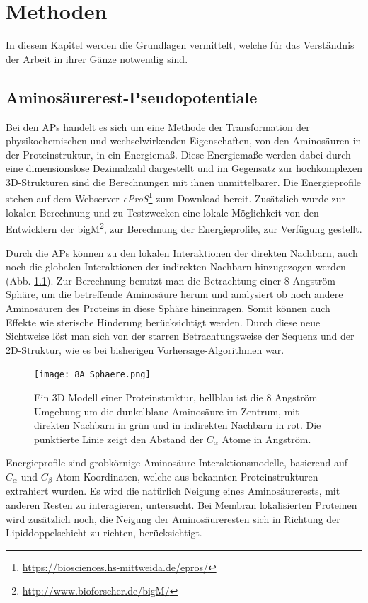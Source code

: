 \chapter{Methoden}

In diesem Kapitel werden die Grundlagen vermittelt, welche für das Verständnis der Arbeit in ihrer Gänze notwendig sind.

\section{Aminosäurerest-Pseudopotentiale}

Bei den \acf{APs} handelt es sich um eine Methode der Transformation der physikochemischen und wechselwirkenden Eigenschaften, von den Aminosäuren in der Proteinstruktur, in ein Energiemaß. Diese Energiemaße werden dabei durch eine dimensionslose Dezimalzahl dargestellt und im Gegensatz zur hochkomplexen 3D-Strukturen sind die Berechnungen mit ihnen unmittelbarer. Die Energieprofile stehen auf dem Webserver \emph{eProS}\footnote{\url{https://biosciences.hs-mittweida.de/epros/}} zum Download bereit. Zusätzlich wurde zur lokalen Berechnung und zu Testzwecken eine lokale Möglichkeit von den Entwicklern der \ac{bigM}\footnote{\url{http://www.bioforscher.de/bigM/}}, zur Berechnung der Energieprofile, zur Verfügung gestellt.

Durch die \ac{APs} können zu den lokalen Interaktionen der direkten Nachbarn, auch noch die globalen Interaktionen der indirekten Nachbarn hinzugezogen werden (Abb. \ref{fig:8A_Sphaere}). Zur Berechnung benutzt man die Betrachtung einer 8 Angström Sphäre, um die betreffende Aminosäure herum und analysiert ob noch andere Aminosäuren des Proteins in diese Sphäre hineinragen. Somit können auch Effekte wie sterische Hinderung berücksichtigt werden. Durch diese neue Sichtweise löst man sich von der starren Betrachtungsweise der Sequenz und der 2D-Struktur, wie es bei bisherigen Vorhersage-Algorithmen war.
%
\begin{figure}
\centering
\texttt{[image: 8A\_Sphaere.png]}
\caption{Ein 3D Modell einer Proteinstruktur, hellblau ist die 8 Angström Umgebung um die dunkelblaue Aminosäure im Zentrum, mit direkten Nachbarn in grün und in indirekten Nachbarn in rot. Die punktierte Linie zeigt den Abstand der $C_{\alpha}$ Atome in Angström.}%
\label{fig:8A_Sphaere}
\end{figure}

Energieprofile sind grobkörnige Aminosäure-Interaktionsmodelle, basierend auf $C_{\alpha}$ und $C_{\beta}$ Atom Koordinaten, welche aus bekannten Proteinstrukturen extrahiert wurden. Es wird die natürlich Neigung eines Aminosäurerests, mit anderen Resten zu interagieren, untersucht. Bei Membran lokalisierten Proteinen wird zusätzlich noch, die Neigung der Aminosäureresten sich in Richtung der Lipiddoppelschicht zu richten, berücksichtigt. 

